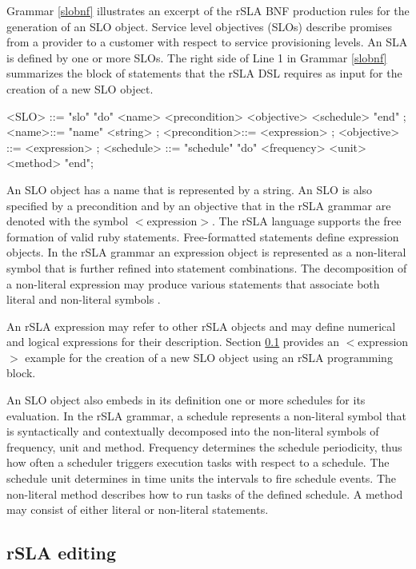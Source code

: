 Grammar \ref{slobnf} illustrates an excerpt of the rSLA BNF production rules for the generation of an SLO object. Service level objectives (SLOs) describe promises from a provider to a customer with respect to service provisioning levels\cite{wsla}. An SLA is defined by one or more SLOs. The right side of Line 1 in Grammar \ref{slobnf} summarizes the block of statements that the rSLA DSL requires as input for the creation of a new SLO object.
\begin{grammar}[caption= Service level objective (SLO) production rules, label=slobnf]
<SLO> ::= "slo" "do" <name> <precondition> <objective> <schedule> "end" ;
<name>::= "name" <string> ;
<precondition>::= <expression> ;
<objective> ::= <expression> ;
<schedule> ::= "schedule" "do" <frequency> <unit> <method> "end";
\end{grammar} 
An SLO object has a name that is represented by a string. An SLO is also specified by a precondition and by an objective that in the rSLA grammar are denoted with the symbol $<$expression$>$. 
The rSLA language supports the free formation of valid ruby statements. Free-formatted statements define expression objects. In the rSLA grammar an expression object is represented as a non-literal symbol that is further refined into statement combinations. The decomposition of a non-literal expression may produce various statements that associate both literal and non-literal symbols . 

An rSLA expression may refer to other rSLA objects and may define numerical and logical expressions for their description. Section \ref{editing} provides an $<$expression$>$ example for the creation of a new SLO object using an rSLA programming block.

An SLO object also embeds in its definition one or more schedules for its evaluation. In the rSLA grammar, a schedule represents a non-literal symbol that is syntactically and contextually decomposed into the non-literal symbols of frequency, unit and method. Frequency determines the schedule periodicity, thus how often a scheduler triggers execution tasks with respect to a schedule. The schedule unit determines in time units the intervals to fire schedule events. The non-literal method describes how to run tasks of the defined schedule. A method may consist of either literal or non-literal statements.

\subsection{rSLA editing}\label{editing}

